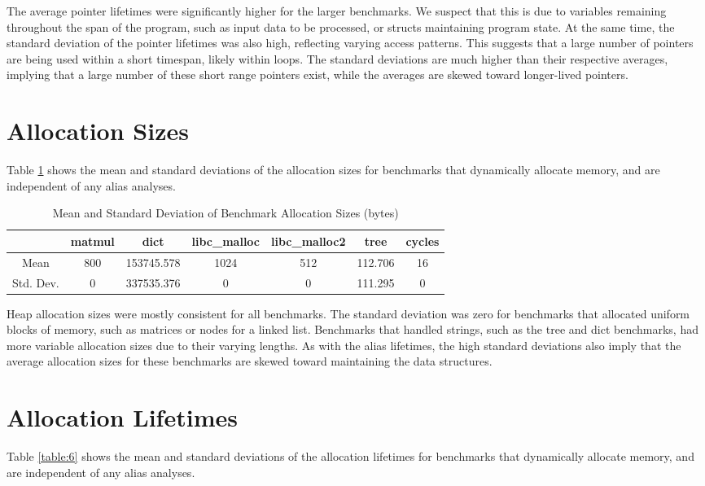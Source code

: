 The average pointer lifetimes were significantly higher for the larger benchmarks. We suspect that this is due to variables remaining throughout the span of the program, such as input data to be processed, or structs maintaining program state. At the same time, the standard deviation of the pointer lifetimes was also high, reflecting varying access patterns. This suggests that a large number of pointers are being used within a short timespan, likely within loops. The standard deviations are much higher than their respective averages, implying that a large number of these short range pointers exist, while the averages are skewed toward longer-lived pointers.

\section{Allocation Sizes}
Table \ref{table:5} shows the mean and standard deviations of the allocation sizes for benchmarks that dynamically allocate memory, and are independent of any alias analyses.

\begin{table} [h!]
\centering
   \begin{tabular} {|c|c c c c c c|}
      \hline
      & matmul & dict & libc\_malloc & libc\_malloc2 & tree & cycles \\
      \hline
      Mean & 800 & 153745.578 & 1024 & 512 & 112.706 & 16 \\
      \hline
      Std. Dev. & 0 & 337535.376 & 0 & 0 & 111.295 & 0 \\
      \hline
   \end{tabular}
	\caption{Mean and Standard Deviation of Benchmark Allocation Sizes (bytes)}
   \label{table:5}
\end{table}

Heap allocation sizes were mostly consistent for all benchmarks. The standard deviation was zero for benchmarks that allocated uniform blocks of memory, such as matrices or nodes for a linked list. Benchmarks that handled strings, such as the tree and dict benchmarks, had more variable allocation sizes due to their varying lengths. As with the alias lifetimes, the high standard deviations also imply that the average allocation sizes for these benchmarks are skewed toward maintaining the data structures.

\section{Allocation Lifetimes}
Table \ref{table:6} shows the mean and standard deviations of the allocation lifetimes for benchmarks that dynamically allocate memory, and are independent of any alias analyses.


